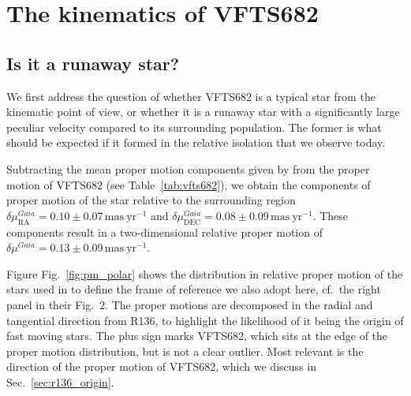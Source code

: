 \documentclass[a4paper,fleqn,usenatbib]{mnras}
\DeclareRobustCommand{\Figref}[1]{Fig.~\ref{#1}}
\DeclareRobustCommand{\Tabref}[1]{Table~\ref{#1}}
\DeclareRobustCommand{\Secref}[1]{Sec.~\ref{#1}}
\begin{document}
\section{The kinematics of VFTS682}
\label{sec:results}

\subsection{Is it a runaway star?}
\label{sec:runaway}
We first address the question of whether VFTS682 is a typical star
from the kinematic point of view, or whether it is a runaway star with
a significantly large peculiar velocity compared to its surrounding population. The former is what should
be expected if it formed in the relative isolation that we observe today.%

Subtracting the mean proper motion components given by
\citet{lennon:18} from the
proper motion of VFTS682 (see \Tabref{tab:vfts682}), we obtain the
components of proper motion of the star relative to the surrounding region
$\delta\mu_\mathrm{RA}^{Gaia} = 0.10 \pm 0.07\,\mathrm{mas\ yr^{-1}}$
and $\delta\mu_\mathrm{DEC}^{Gaia} = 0.08
\pm 0.09\,\mathrm{mas\ yr^{-1}}$. These components result in a
two-dimensional relative proper motion of $\delta \mu^{Gaia}=0.13\pm 0.09\,\mathrm{mas\
  yr^{-1}}$.

Figure \Figref{fig:pm_polar} shows the distribution in relative proper motion
of the stars used in \cite{lennon:18} to define the frame of reference
we also adopt here, cf.~the right panel in their Fig.~2. The
proper motions are decomposed in the radial and tangential direction
from R136, to highlight the likelihood of it being the origin of fast
moving stars. The plus sign marks VFTS682, which sits at the edge of
the proper motion distribution, but is not a clear outlier. Most
relevant is the direction of the proper motion of VFTS682, which we
discuss in \Secref{sec:r136_origin}.
\end{document}
